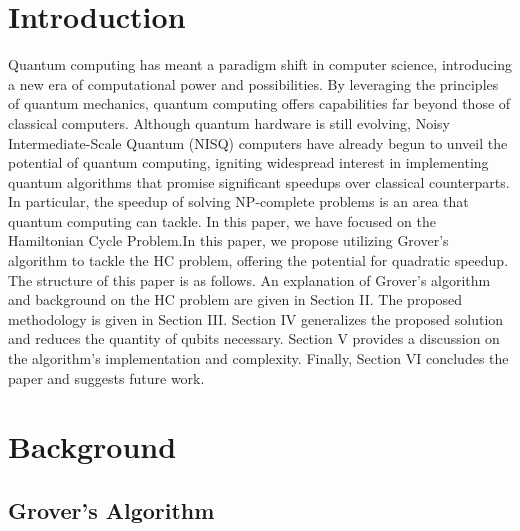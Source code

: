 \documentclass[10pt,a4paper]{article}
\begin{document}
\section{Introduction}

Quantum computing has meant a paradigm shift in computer science, introducing a new era of computational power and possibilities. By leveraging the principles of quantum mechanics, quantum computing offers capabilities far beyond those of classical computers. Although quantum hardware is still evolving, Noisy Intermediate-Scale Quantum (NISQ) \cite{Preskill} computers have already begun to unveil the potential of quantum computing, igniting widespread interest in implementing quantum algorithms that promise significant speedups over classical counterparts. In particular, the speedup of solving NP-complete problems is an area that quantum computing can tackle. In this paper, we have focused on the Hamiltonian Cycle Problem.In this paper, we propose utilizing Grover's algorithm to tackle the HC problem, offering the potential for quadratic speedup.\\
The structure of this paper is as follows. An explanation of Grover's algorithm and background on the HC problem are given in Section II. The proposed methodology is given in Section III. Section IV generalizes the proposed solution and reduces the quantity of qubits necessary. Section V provides a discussion on the algorithm's implementation and complexity. Finally, Section VI concludes the paper and suggests future work.\\


\section{Background}
\subsection{Grover's Algorithm}
\end{document}
